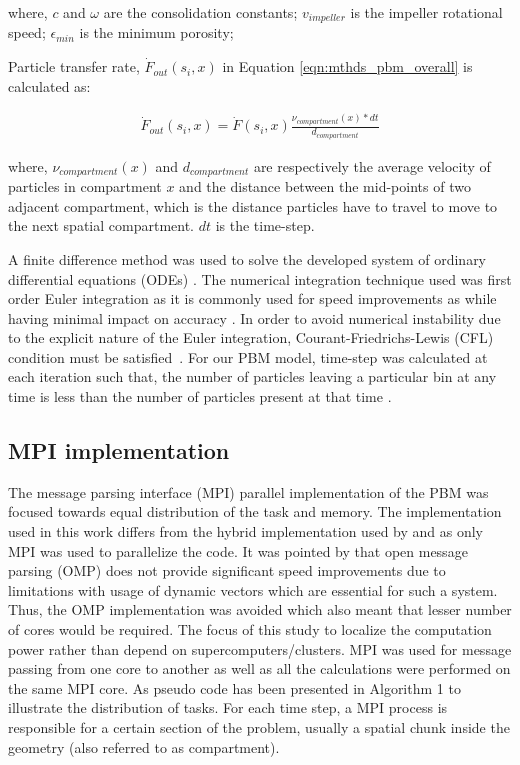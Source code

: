 \documentclass[preprint,10pt,authoryear,review]{elsarticle}
\begin{document}
\begin{linenumbers}
where, $c$ and $\omega$ are the consolidation constants; $v_{impeller}$ is the impeller 
rotational speed; $\epsilon_{min}$ is the minimum porosity; 

Particle transfer rate, $\dot{F}_{out}(s_i,x)$ in Equation \ref{eqn:mthds_pbm_overall} 
is calculated as:

\begin{align}
\dot{F}_{out}(s_i,x) = \dot{F}(s_i,x)\frac{\nu_{compartment}(x)*dt}{d_{compartment}}
\label{eqn:mthds_f_out_dot_part_trans_rate}
\end{align}

where, $\nu_{compartment}(x)$ and $d_{compartment}$ are respectively the average 
velocity of particles in compartment $x$ and the distance between the mid-points 
of two adjacent compartment, which is the distance particles have to travel to 
move to the next spatial compartment. $dt$ is the time-step.

A finite difference method was used to solve the developed system of ordinary differential 
equations (ODEs) \citep{Barrasso2015cerd}. The numerical integration technique used 
was first order Euler integration as it is commonly used for speed improvements as while 
having minimal impact on accuracy \citep{Barrasso2013}. In order to avoid numerical 
instability due to the explicit nature of the Euler integration, Courant-Friedrichs-Lewis 
(CFL) condition must be satisfied~\citep{courant1967}. For our PBM model, time-step was 
calculated at each iteration such that, the number of particles leaving a particular bin 
at any time is less than the number of particles present at that time \citep{Ramachandran2010}.

\subsection{MPI implementation}
The message parsing interface (MPI) parallel implementation of the PBM was 
focused towards equal distribution of the task and memory. The implementation 
used in this work differs from the hybrid implementation used by \citep{Bettencourt2017}
and \citep{Sampat2018} as only MPI was used to parallelize the code. It 
was pointed by \citep{Sampat2018} that open message parsing (OMP) does not 
provide significant speed improvements due to limitations with usage of 
dynamic vectors which are essential for such a system. Thus, the OMP 
implementation was avoided which also meant that lesser number of cores 
would be required. The focus of this study to localize the computation power 
rather than depend on supercomputers/clusters. MPI was used for message passing 
from one core to another as well as all the calculations  
were performed on the same MPI core. As pseudo code has been presented in Algorithm 1 
to illustrate the distribution of tasks. For each time step, a MPI process is responsible 
for a certain section of the problem, usually a spatial chunk inside the geometry 
(also referred to as compartment).  




\end{linenumbers}
\end{document}

